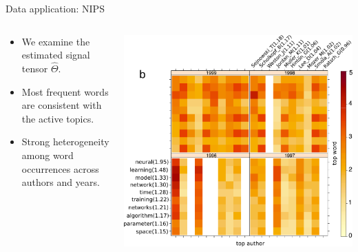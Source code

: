 \documentclass[10pt, mathserif]{beamer} %
\theoremstyle{definition}
\theoremstyle{plain}
\begin{document}
\begin{frame}{Data application: NIPS}
\begin{columns}
\begin{column}{0.6\textwidth}
 \begin{itemize}
     \item We examine the estimated signal tensor $\hat\Theta.$
     \item Most frequent words are consistent with the active topics.
     \item Strong heterogeneity among word occurrences across authors and years.
 \end{itemize}
\end{column}
\begin{column}{0.4\textwidth} 
   \begin{center}
     \includegraphics[width=\textwidth]{Figures/signal.pdf}
     \end{center}
\end{column}
\end{columns}
\end{frame}
\end{document}
